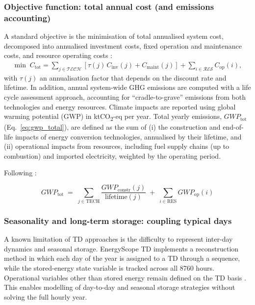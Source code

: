 \documentclass{article}
\begin{document}
\subsubsection{Objective function: total annual cost (and emissions accounting)}
A standard objective is the minimisation of total annualised system cost,
decomposed into annualised investment costs, fixed operation and maintenance costs, and resource operating costs \citep{limpensEnergyScopeTDNovel2019}:
\begin{align}
\min \; C_{\mathrm{tot}}
= \sum_{j \in \mathcal{TECH}} \left[\tau(j)\, C_{\mathrm{inv}}(j) + C_{\mathrm{maint}}(j)\right]
+ \sum_{i \in \mathcal{RES}} C_{\mathrm{op}}(i),
\end{align}
with $\tau(j)$ an annualisation factor that depends on the discount rate and lifetime. 
In addition, annual system-wide GHG emissions are computed with a life cycle assessment approach, accounting for “cradle-to-grave” emissions from both technologies and energy resources. Climate impacts are reported using global warming potential (GWP) in ktCO\textsubscript{2}-eq per year. Total yearly emissions, $GWP_{\text{tot}}$ (Eq.~\eqref{eq:gwp_total}), are defined as the sum of (i) the construction and end-of-life impacts of energy conversion technologies, annualised by their lifetime, and (ii) operational impacts from resources, including fuel supply chains (up to combustion) and imported electricity, weighted by the operating period.

Following \citet{limpensEnergyScopeTDNovel2019}:

\begin{equation}
GWP_{\mathrm{tot}} \;=\; \sum_{j \in \mathrm{TECH}} \frac{GWP_{\mathrm{constr}}(j)}{\mathrm{lifetime}(j)} \;+\; \sum_{i \in \mathrm{RES}} GWP_{\mathrm{op}}(i)
\label{eq:gwp_total}
\end{equation}
 


\subsubsection{Seasonality and long-term storage: coupling typical days}
A known limitation of TD approaches is the difficulty to represent inter-day dynamics and seasonal storage. EnergyScope TD implements a reconstruction method in which each day of the year is assigned to a TD through a sequence, while the stored-energy state variable is tracked across all 8760 hours. Operational variables other than stored energy remain defined on the TD basis \citep{limpensGeneratingEnergyTransition2021}. This enables modelling of day-to-day and seasonal storage strategies without solving the full hourly year.
\end{document}
